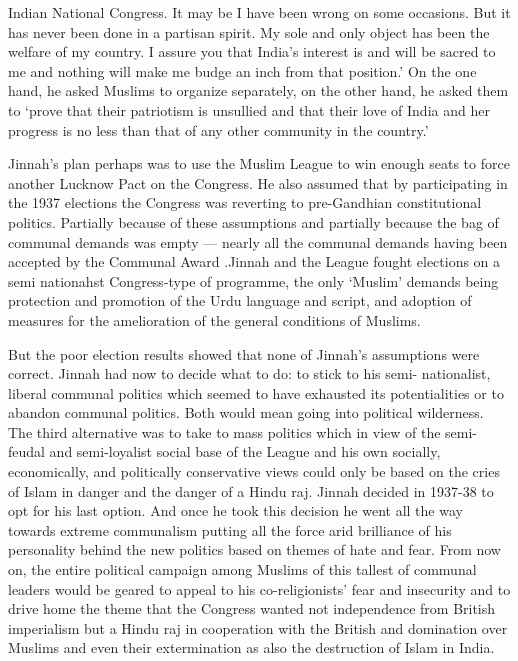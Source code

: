 Indian National Congress. It may be I have been wrong on some occasions. But it has never been done in a partisan spirit. My sole and only object has been the welfare of my country. I assure you that India's interest is and will be sacred to me and nothing will make me budge an inch from that position.' On the one hand, he asked Muslims to organize separately, on the other hand, he asked them to `prove that their patriotism is unsullied and that their love of India and her progress is no less than that of any other community in the country.' 

Jinnah's plan perhaps was to use the Muslim League to win enough seats to force another Lucknow Pact on the Congress. He also assumed that by participating in the 1937 elections the Congress was reverting to pre-Gandhian constitutional politics. Partially because of these assumptions and partially because the bag of communal demands was empty — nearly all the communal demands having been accepted by the Communal Award .Jinnah and the League fought elections on a semi­ nationahst Congress-type of programme, the only `Muslim' demands being protection and promotion of the Urdu language and script, and adoption of measures for the amelioration of the general conditions of Muslims. 

But the poor election results showed that none of Jinnah's assumptions were correct. Jinnah had now to decide what to do: to stick to his semi- nationalist, liberal communal politics which seemed to have exhausted its potentialities or to abandon communal politics. Both would mean going into political wilderness. The third alternative was to take to mass politics which in view of the semi-feudal and semi-loyalist social base of the League and his own socially, economically, and politically conservative views could only be based on the cries of Islam in danger and the danger of a Hindu raj. Jinnah decided in 1937-38 to opt for his last option. And once he took this decision he went all the way towards extreme communalism putting all the force arid brilliance of his personality behind the new politics based on themes of hate and fear. From now on, the entire political campaign among Muslims of this tallest of communal leaders would be geared to appeal to his co-religionists' fear and insecurity and to drive home the theme that the Congress wanted not independence from British imperialism but a Hindu raj in cooperation with the British and domination over Muslims and even their extermination as also the destruction of Islam in India. 

